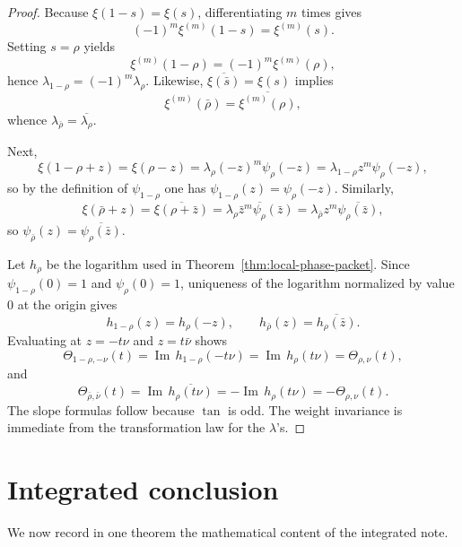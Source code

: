 \documentclass[11pt,a4paper]{article}
\numberwithin{equation}{section}
\theoremstyle{definition}
\theoremstyle{remark}
\DeclareMathOperator{\Ima}{Im}
\begin{document}
\begin{proof}
Because $\xi(1-s)=\xi(s)$, differentiating $m$ times gives
\[
(-1)^m\xi^{(m)}(1-s)=\xi^{(m)}(s).
\]
Setting $s=\rho$ yields
\[
\xi^{(m)}(1-\rho)=(-1)^m\xi^{(m)}(\rho),
\]
hence $\lambda_{1-\rho}=(-1)^m\lambda_\rho$.  Likewise, $\overline{\xi(\bar s)}=\xi(s)$ implies
\[
\xi^{(m)}(\bar\rho)=\overline{\xi^{(m)}(\rho)},
\]
whence $\lambda_{\bar\rho}=\overline{\lambda_\rho}$.

Next,
\[
\xi(1-\rho+z)=\xi(\rho-z)=\lambda_\rho(-z)^m\psi_\rho(-z)=\lambda_{1-\rho} z^m\psi_\rho(-z),
\]
so by the definition of $\psi_{1-\rho}$ one has $\psi_{1-\rho}(z)=\psi_\rho(-z)$.  Similarly,
\[
\xi(\bar\rho+z)=\overline{\xi(\rho+\bar z)}
=\overline{\lambda_\rho \bar z^m \psi_\rho(\bar z)}
=\lambda_{\bar\rho} z^m\overline{\psi_\rho(\bar z)},
\]
so $\psi_{\bar\rho}(z)=\overline{\psi_\rho(\bar z)}$.

Let $h_\rho$ be the logarithm used in Theorem~\ref{thm:local-phase-packet}.  Since $\psi_{1-\rho}(0)=1$ and $\psi_\rho(0)=1$, uniqueness of the logarithm normalized by value $0$ at the origin gives
\[
h_{1-\rho}(z)=h_\rho(-z),
\qquad
h_{\bar\rho}(z)=\overline{h_\rho(\bar z)}.
\]
Evaluating at $z=-t\nu$ and $z=t\bar\nu$ shows
\[
\Theta_{1-\rho,-\nu}(t)=\Ima\,h_{1-\rho}(-t\nu)=\Ima\,h_\rho(t\nu)=\Theta_{\rho,\nu}(t),
\]
and
\[
\Theta_{\bar\rho,\bar\nu}(t)=\Ima\,\overline{h_\rho(t\nu)}=-\Ima\,h_\rho(t\nu)=-\Theta_{\rho,\nu}(t).
\]
The slope formulas follow because $\tan$ is odd.  The weight invariance is immediate from the transformation law for the $\lambda$'s.
\end{proof}

\section{Integrated conclusion}

We now record in one theorem the mathematical content of the integrated note.
\end{document}
